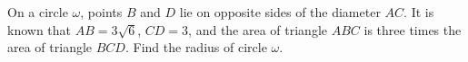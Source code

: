On a circle $\omega$, points $B$ and $D$ lie on opposite sides of the diameter $AC$. It is known that $AB=3\sqrt{6}$, $CD=3$, and the area of triangle $ABC$ is three times the area of triangle $BCD$. Find the radius of circle $\omega$.
